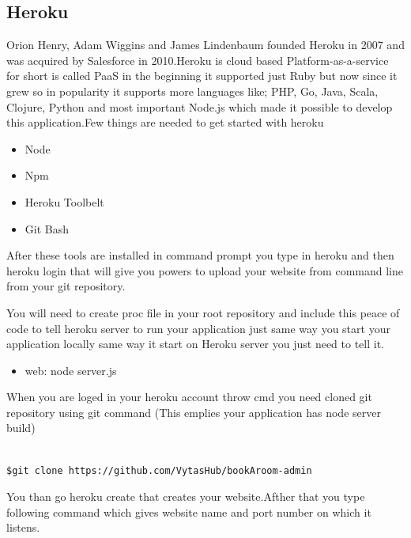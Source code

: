 \begin{itemize}
\subsection{Heroku}
\bigbreak

  Orion Henry, Adam Wiggins and James Lindenbaum founded Heroku in 2007 and was acquired by Salesforce in 2010.Heroku is cloud based Platform-as-a-service for short is called PaaS in the beginning it supported just Ruby but now since it grew so in popularity it supports more languages like; PHP, Go, Java, Scala, Clojure, Python and most important Node.js which made it possible to develop this application.Few things are needed to get started with heroku
\bigbreak
\begin{itemize}

	\item Node 
	\item Npm
	\item Heroku Toolbelt
	\item Git Bash
	
\end{itemize}
\bigbreak

After these tools are installed in command prompt you type in heroku and then heroku login that will give you powers to upload your website from command line from your git repository.

You will need to create proc file in your root repository and include this peace of code to tell heroku server to run your application just same way you start your application locally same way it start on Heroku server you just need to tell it.

\bigbreak


\begin{itemize}
	
	\item web: node server.js

\end{itemize}
\bigbreak

When you are loged in your heroku account throw cmd you need cloned git repository using git command (This emplies your application has node server build)
\bigbreak

\begin{verbatim}

$git clone https://github.com/VytasHub/bookAroom-admin

\end{verbatim}
\bigbreak

You than go heroku create that creates your website.Afther that you type following command which gives website name and port number on which it listens. 


\end{itemize}
